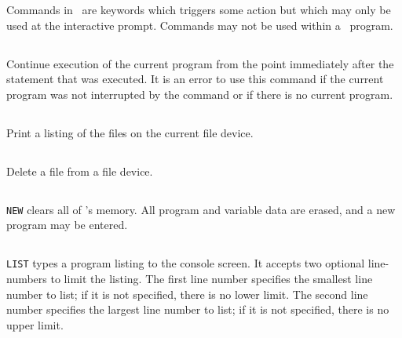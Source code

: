 \documentclass{report}
\begin{document}
    Commands in \BASIC\ are keywords which triggers some action but which may only be used at the interactive prompt.
    Commands may not be used within a \BASIC\ program.

    \subsection*{}

    Continue execution of the current program from the point immediately after the  statement that was executed.
    It is an error to use this command if the current program was not interrupted by the  command or if there
    is no current program.

    \subsection*{}

    Print a listing of the files on the current file device.

    \subsection*{ }

    Delete a file from a file device.

    \subsection*{}

    \verb+NEW+ clears all of \BASIC's memory. All program and variable data are erased, and a new program may be entered.

    \subsection*{}

    \verb+LIST+ types a program listing to the console screen. It accepts two optional line-numbers to limit the listing.
    The first line number specifies the smallest line number to list; if it is not specified, there is no lower limit.
    The second line number specifies the largest line number to list; if it is not specified, there is no upper limit.

    \subsection*{ }
\end{document}
